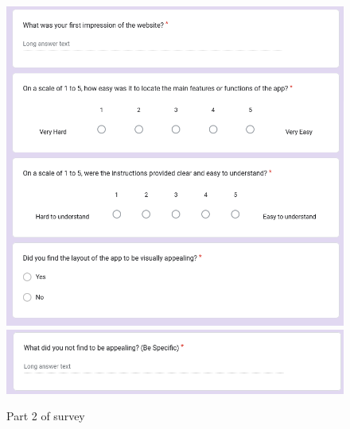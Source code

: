 \documentclass[12pt, titlepage]{article}
\begin{document}
\begin{figure}[H]
    \centering
    \includegraphics[width=1\linewidth]{survey_part_2.png}
    \includegraphics[width=1\linewidth]{survey_part_2_5.png}
    \caption{Part 2 of survey}
    \label{fig:pt2}
\end{figure}
\end{document}
